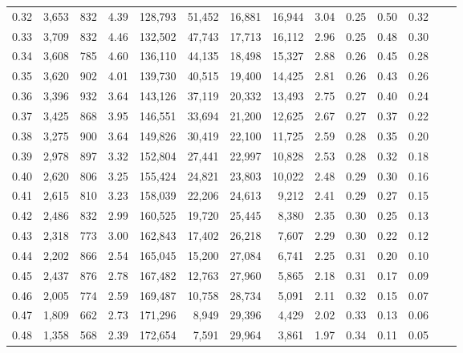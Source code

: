 \begin{tabular}{rrrrrrrrrrrrrr}
0.32 &  3,653 &    832 &    4.39 &  128,793 &   51,452 &  16,881 &  16,944 &  3.04 &  0.25 &  0.50 &      0.32 \\
0.33 &  3,709 &    832 &    4.46 &  132,502 &   47,743 &  17,713 &  16,112 &  2.96 &  0.25 &  0.48 &      0.30 \\
0.34 &  3,608 &    785 &    4.60 &  136,110 &   44,135 &  18,498 &  15,327 &  2.88 &  0.26 &  0.45 &      0.28 \\
0.35 &  3,620 &    902 &    4.01 &  139,730 &   40,515 &  19,400 &  14,425 &  2.81 &  0.26 &  0.43 &      0.26 \\
0.36 &  3,396 &    932 &    3.64 &  143,126 &   37,119 &  20,332 &  13,493 &  2.75 &  0.27 &  0.40 &      0.24 \\
0.37 &  3,425 &    868 &    3.95 &  146,551 &   33,694 &  21,200 &  12,625 &  2.67 &  0.27 &  0.37 &      0.22 \\
0.38 &  3,275 &    900 &    3.64 &  149,826 &   30,419 &  22,100 &  11,725 &  2.59 &  0.28 &  0.35 &      0.20 \\
0.39 &  2,978 &    897 &    3.32 &  152,804 &   27,441 &  22,997 &  10,828 &  2.53 &  0.28 &  0.32 &      0.18 \\
0.40 &  2,620 &    806 &    3.25 &  155,424 &   24,821 &  23,803 &  10,022 &  2.48 &  0.29 &  0.30 &      0.16 \\
0.41 &  2,615 &    810 &    3.23 &  158,039 &   22,206 &  24,613 &   9,212 &  2.41 &  0.29 &  0.27 &      0.15 \\
0.42 &  2,486 &    832 &    2.99 &  160,525 &   19,720 &  25,445 &   8,380 &  2.35 &  0.30 &  0.25 &      0.13 \\
0.43 &  2,318 &    773 &    3.00 &  162,843 &   17,402 &  26,218 &   7,607 &  2.29 &  0.30 &  0.22 &      0.12 \\
0.44 &  2,202 &    866 &    2.54 &  165,045 &   15,200 &  27,084 &   6,741 &  2.25 &  0.31 &  0.20 &      0.10 \\
0.45 &  2,437 &    876 &    2.78 &  167,482 &   12,763 &  27,960 &   5,865 &  2.18 &  0.31 &  0.17 &      0.09 \\
0.46 &  2,005 &    774 &    2.59 &  169,487 &   10,758 &  28,734 &   5,091 &  2.11 &  0.32 &  0.15 &      0.07 \\
0.47 &  1,809 &    662 &    2.73 &  171,296 &    8,949 &  29,396 &   4,429 &  2.02 &  0.33 &  0.13 &      0.06 \\
0.48 &  1,358 &    568 &    2.39 &  172,654 &    7,591 &  29,964 &   3,861 &  1.97 &  0.34 &  0.11 &      0.05 \\

\end{tabular}
